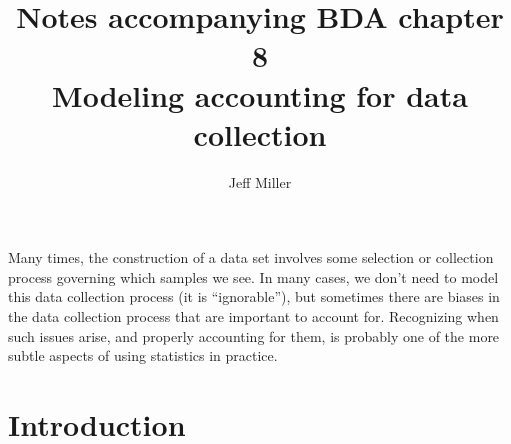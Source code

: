 \documentclass[12pt]{article}
\title{Notes accompanying BDA chapter 8\\
\large Modeling accounting for data collection
}
\author{Jeff Miller}
\begin{document}
\maketitle

\tableofcontents



\vspace{2em}

Many times, the construction of a data set involves some selection or collection process governing which samples we see. In many cases, we don't need to model this data collection process (it is ``ignorable''), but sometimes there are biases in the data collection process that are important to account for. Recognizing when such issues arise, and properly accounting for them, is probably one of the more subtle aspects of using statistics  in practice.

\section{Introduction}
\end{document}
